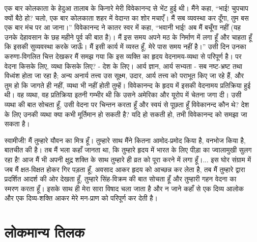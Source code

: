 एक बार कोलकाता के हेदुआ तालाब के किनारे मेरी विवेकानन्द से भेंट हुई थी। मैंने कहा, “भाई! चुपचाप क्यों बैठे हो? चलो, एक बार कोलकाता शहर में वेदान्त का शोर मचाएँ। मैं सब व्यवस्था कर दूँगा, तुम बस एक बार मंच पर आ जाना।” विवेकानन्द ने कातर स्वर में कहा, “भवानी भाई! अब मैं बचूँगा नहीं (यह उनके देहावसान के छह महीने पूर्व की बात है)। मैं इस समय अपने मठ के निर्माण में लगा हूँ और चाहता हूँ कि इसकी सुव्यवस्था करके जाऊँ। मैं इसी कार्य में व्यस्त हूँ, मेरे पास समय नहीं है।” उसी दिन उनका करुणा-विगलित चित्त देखकर मैं समझ गया कि इस व्यक्ति का हृदय वेदनामय-व्यथा से परिपूर्ण है। पर वेदना किसके लिए, व्यथा किसके लिए? - देश के लिए। आर्य ज्ञान, आर्य सभ्यता - सब नष्ट-भ्रष्ट तथा विध्वंश होता जा रहा है; अन्य अनार्य तत्त्व उस सूक्ष्म, उदार, आर्य तत्त्व को पराभूत किए जा रहे हैं, और तुम हो कि जागते ही नहीं, व्यथा भी नहीं होती तुम्हें। विवेकानन्द के हृदय में इसकी वेदनामय प्रतिक्रिया हुई थी। वह व्यथा, वह प्रतिक्रिया इतनी गम्भीर थी कि उसने अमेरिका और यूरोप में चेतना जगा दी। उसी व्यथा की बात सोचता हूँ, उसी वेदना पर चिन्तन करता हूँ और स्वयं से पूछता हूँ विवेकानन्द कौन थे? देश के लिए उनकी व्यथा क्या कभी मूर्तिमान हो सकती है? यदि हो सकती हो, तभी विवेकानन्द को समझा जा सकता है। 

स्वामीजी! मैं तुम्हारे यौवन का मित्र हूँ। तुम्हारे साथ मैंने कितना आमोद-प्रमोद किया है, वनभोज किया है, बातचीत की है। तब मैं भला कहाँ जानता था, कि तुम्हारे हृदय में भारत के लिए पीड़ा का ज्वालामुखी सुलग रहा है! आज मैं भी अपनी क्षुद्र शक्ति के साथ तुम्हारे ही व्रत को पूरा करने में लगा हूँ।... इस घोर संग्राम में जब मैं क्षत-विक्षत होकर गिर पड़ता हूँ, अवसाद आकर हृदय को आच्छन्न कर लेता है, तब मैं तुम्हारे द्वारा प्रदर्शित आदर्श की ओर देखता हूँ, तुम्हारे सिंह-विक्रम की बात सोचता हूँ और तुम्हारी गहन वेदना का स्मरण करता हूँ। इसके साथ ही मेरा सारा विषाद चला जाता है और न जाने कहाँ से एक दिव्य आलोक और एक दिव्य-शक्ति आकर मेरे मन-प्राण को परिपूर्ण कर देती है।


\section*{लोकमान्य तिलक}


